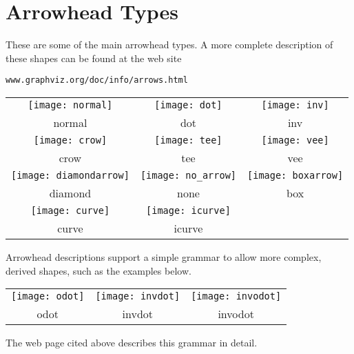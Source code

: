 \documentclass[11pt]{article}
\begin{document}
{\clearpage
\section{Arrowhead Types}
\label{app:arrows}
These are some of the main arrowhead types. A more complete description of
these shapes can be found at the web site
\begin{center}
{\tt www.graphviz.org/doc/info/arrows.html}
\end{center}
\begin{center}
\begin{tabular}{ccc}
\texttt{[image: normal]} & \texttt{[image: dot]} & \texttt{[image: inv]} \\
normal & dot & inv \\
\texttt{[image: crow]} & \texttt{[image: tee]} & \texttt{[image: vee]} \\
crow & tee & vee \\
\texttt{[image: diamondarrow]} & \texttt{[image: no\_arrow]} & \texttt{[image: boxarrow]} \\
diamond & none & box \\
\texttt{[image: curve]} & \texttt{[image: icurve]} & \\
curve & icurve & \\
\end{tabular}
\end{center}
Arrowhead descriptions support a simple grammar to allow more complex, derived shapes,
such as the examples below.
\begin{center}
\begin{tabular}{ccc}
\texttt{[image: odot]} & \texttt{[image: invdot]} & \texttt{[image: invodot]} \\
odot & invdot & invodot \\
\end{tabular}
\end{center}
The web page cited above describes this grammar in detail.

\clearpage
}
\end{document}
